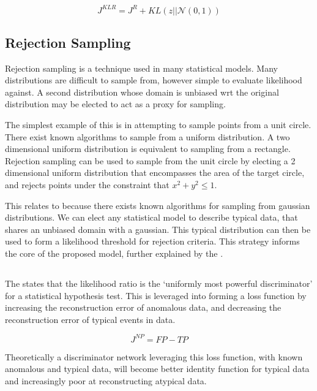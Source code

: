\documentclass{article}
\begin{document}
\begin{multicols}{2}
\[J^{KLR}=J^R + KL(z||\mathcal{N}(0, 1))\]

\resizebox{.8\columnwidth}{!}{}


\subsection{Rejection Sampling}

Rejection sampling is a technique used in many statistical models. Many distributions
are difficult to sample from, however simple to evaluate likelihood against. A second
distribution whose domain is unbiased wrt the original distribution may be elected to
act as a proxy for sampling.

The simplest example of this is in attempting to sample points from a unit circle. There
exist known algorithms to sample from a uniform distribution. A two dimensional uniform
distribution is equivalent to sampling from a rectangle. Rejection sampling can be used
to sample from the unit circle by electing a 2 dimensional uniform distribution that
encompasses the area of the target circle, and rejects points under the constraint that
$x^2 + y^2 \le 1$.

This relates to \vae because there exists known algorithms for sampling from gaussian
distributions. We can elect any statistical model to describe typical data, that
shares an unbiased domain with a gaussian. This typical distribution can then be used
to form a likelihood threshold for rejection criteria. This strategy informs the core
of the proposed model, further explained by the \np.

\subsection{\np}

The \np states that the likelihood ratio is the `uniformly most powerful discriminator'
for a statistical hypothesis test. This is leveraged into forming a loss function by
increasing the reconstruction error of anomalous data, and decreasing the reconstruction
error of typical events in data.

\[J^{NP} = FP - TP\]

Theoretically a discriminator network leveraging this loss function, with known anomalous
and typical data, will become better identity function for typical data and increasingly
poor at reconstructing atypical data.


\end{multicols}
\end{document}
